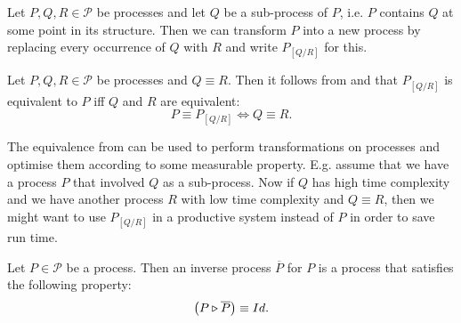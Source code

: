 
\begin{definition}
\label{def:process_substitution}
Let $P, Q, R \in \mathcal{P}$ be processes and let $Q$ be a sub-process of $P$, i.e. $P$ contains $Q$ at some point in its structure. Then we can transform $P$ into a new process by replacing every occurrence of $Q$ with $R$ and write $P_{\left[ Q / R \right]}$ for this.

\hfill\qedsymbol
\end{definition}



\begin{corollary}
\label{crl:process_substitution}
Let $P, Q, R \in \mathcal{P}$ be processes and $Q \equiv R$. Then it follows from  and  that $P_{\left[ Q / R \right]}$ is equivalent to $P$ iff $Q$ and $R$ are equivalent:
  \begin{equation}
    P \equiv P_{\left[ Q / R \right]} \Leftrightarrow Q \equiv R.
  \end{equation}
  \hfill\qedsymbol
\end{corollary}

The equivalence from  can be used to perform transformations on processes and optimise them according to some measurable property. E.g. assume that we have a process $P$ that involved $Q$ as a sub-process. Now if $Q$ has high time complexity and we have another process $R$ with low time complexity and $Q \equiv R$, then we might want to use $P_{\left[ Q / R \right]}$ in a productive system instead of $P$ in order to save run time.


\begin{definition}
\label{def:inverse_process}
Let $P \in \mathcal{P}$ be a process. Then an inverse process $\overline{P}$ for $P$ is a process that satisfies the following property:
  \begin{equation}
    \left( P \triangleright \overline{P} \right) \equiv Id.
  \end{equation}
  \hfill\qedsymbol
\end{definition}


